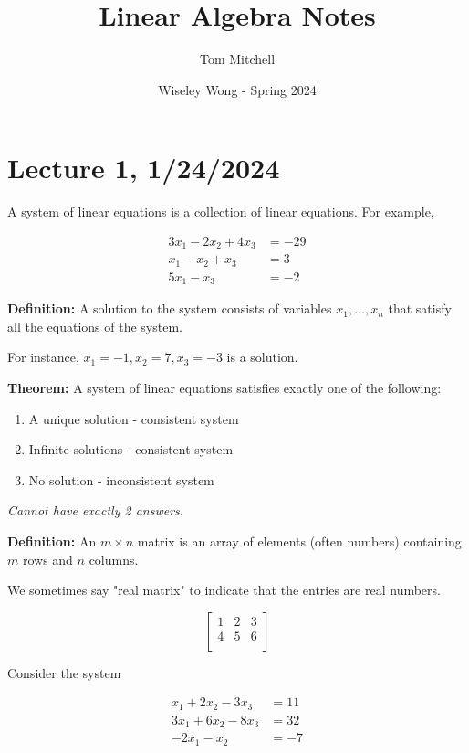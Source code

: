 \documentclass{article}
\title{Linear Algebra Notes}
\author{Tom Mitchell}
\date{Wiseley Wong - Spring 2024}
\begin{document}
\maketitle

\section{Lecture 1, 1/24/2024}

A system of linear equations is a collection of linear equations. For example, 

\begin{align*}
    3x_1 - 2x_2 + 4x_3 &= -29 \\
    x_1 - x_2 + x_3 &= 3 \\
    5x_1 - x_3 &= -2
\end{align*}

\textbf{Definition:} A solution to the system consists of variables $x_1, \ldots , x_n$ that satisfy all the equations of the system.

For instance, $x_1=-1, x_2=7, x_3=-3$ is a solution.

\textbf{Theorem:} A system of linear equations satisfies exactly one of the following:
\begin{enumerate}
    \item A unique solution - consistent system
    \item Infinite solutions - consistent system
    \item No solution - inconsistent system
\end{enumerate}

\textit{Cannot have exactly 2 answers.}

\textbf{Definition:} An $m \times n$ matrix is an array of elements (often numbers) containing $m$ rows and $n$ columns.

We sometimes say "real matrix" to indicate that the entries are real numbers.

\[
\begin{bmatrix}
    1 & 2 & 3 \\
    4 & 5 & 6 \\
\end{bmatrix}
\]

Consider the system

\begin{align*}
    x_1 + 2x_2 - 3x_3 &= 11 \\
    3x_1 + 6x_2 - 8x_3 &= 32 \\
    -2x_1 - x_2 &= -7
\end{align*}
\end{document}

